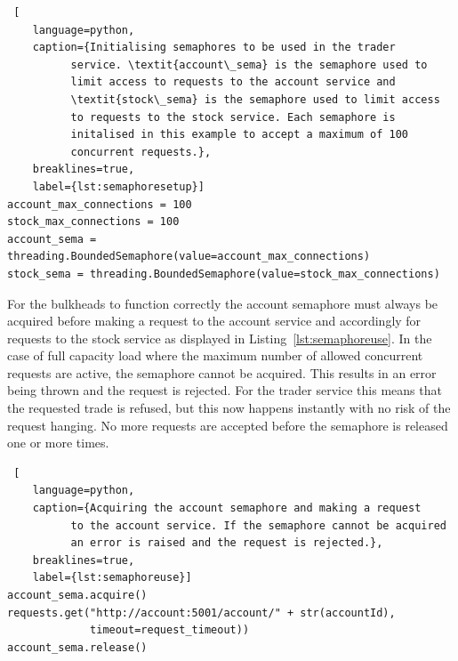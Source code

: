 \begin{lstlisting} [
	language=python,
	caption={Initialising semaphores to be used in the trader
          service. \textit{account\_sema} is the semaphore used to
          limit access to requests to the account service and
          \textit{stock\_sema} is the semaphore used to limit access
          to requests to the stock service. Each semaphore is
          initalised in this example to accept a maximum of 100
          concurrent requests.},
	breaklines=true,
	label={lst:semaphoresetup}]
account_max_connections = 100
stock_max_connections = 100
account_sema = threading.BoundedSemaphore(value=account_max_connections)
stock_sema = threading.BoundedSemaphore(value=stock_max_connections)
\end{lstlisting}
For the bulkheads to function correctly the account semaphore must
always be acquired before making a request to the account service and
accordingly for requests to the stock service as displayed in
Listing~\ref{lst:semaphoreuse}. In the case of full capacity load
where the maximum number of allowed concurrent requests are active,
the semaphore cannot be acquired. This results in an error being
thrown and the request is rejected. For the trader service this means
that the requested trade is refused, but this now happens instantly
with no risk of the request hanging. No more requests are accepted
before the semaphore is released one or more times.

\begin{lstlisting} [
	language=python,
	caption={Acquiring the account semaphore and making a request
          to the account service. If the semaphore cannot be acquired
          an error is raised and the request is rejected.},
	breaklines=true,
	label={lst:semaphoreuse}]
account_sema.acquire()
requests.get("http://account:5001/account/" + str(accountId),
             timeout=request_timeout))
account_sema.release()
\end{lstlisting}


